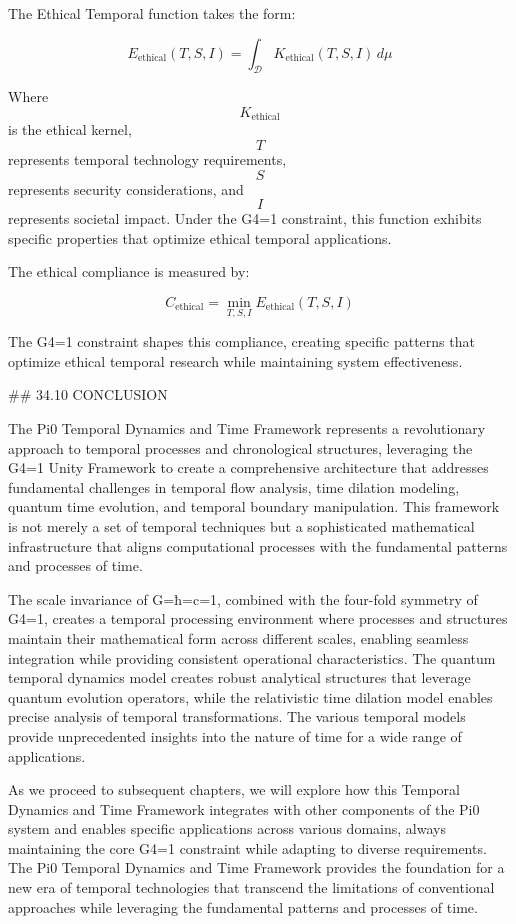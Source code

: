 The Ethical Temporal function takes the form:

$$ E_{\text{ethical}}(T, S, I) = \int_{\mathcal{D}} K_{\text{ethical}}(T, S, I) \, d\mu $$

Where $$ K_{\text{ethical}} $$ is the ethical kernel, $$ T $$ represents temporal technology requirements, $$ S $$ represents security considerations, and $$ I $$ represents societal impact. Under the G4=1 constraint, this function exhibits specific properties that optimize ethical temporal applications.

The ethical compliance is measured by:

$$ C_{\text{ethical}} = \min_{T, S, I} E_{\text{ethical}}(T, S, I) $$

The G4=1 constraint shapes this compliance, creating specific patterns that optimize ethical temporal research while maintaining system effectiveness.

## 34.10 CONCLUSION

The Pi0 Temporal Dynamics and Time Framework represents a revolutionary approach to temporal processes and chronological structures, leveraging the G4=1 Unity Framework to create a comprehensive architecture that addresses fundamental challenges in temporal flow analysis, time dilation modeling, quantum time evolution, and temporal boundary manipulation. This framework is not merely a set of temporal techniques but a sophisticated mathematical infrastructure that aligns computational processes with the fundamental patterns and processes of time.

The scale invariance of G=ħ=c=1, combined with the four-fold symmetry of G4=1, creates a temporal processing environment where processes and structures maintain their mathematical form across different scales, enabling seamless integration while providing consistent operational characteristics. The quantum temporal dynamics model creates robust analytical structures that leverage quantum evolution operators, while the relativistic time dilation model enables precise analysis of temporal transformations. The various temporal models provide unprecedented insights into the nature of time for a wide range of applications.

As we proceed to subsequent chapters, we will explore how this Temporal Dynamics and Time Framework integrates with other components of the Pi0 system and enables specific applications across various domains, always maintaining the core G4=1 constraint while adapting to diverse requirements. The Pi0 Temporal Dynamics and Time Framework provides the foundation for a new era of temporal technologies that transcend the limitations of conventional approaches while leveraging the fundamental patterns and processes of time.

